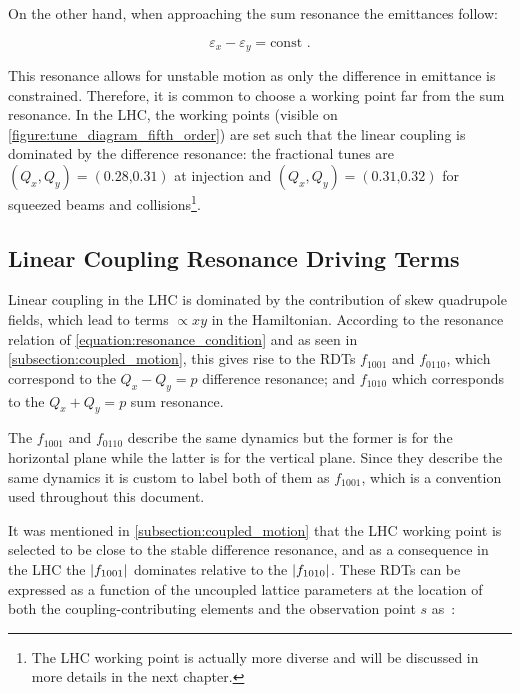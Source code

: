 On the other hand, when approaching the sum resonance the emittances follow:

\begin{equation}
    \varepsilon_x - \varepsilon_y = \mathrm{const} \text{ .}
    \label{equation:coupled_emittances_sum_resonance}
\end{equation}

This resonance allows for unstable motion as only the difference in emittance is constrained.
Therefore, it is common to choose a working point far from the sum resonance.
In the \gls{LHC}, the working points (visible on \cref{figure:tune_diagram_fifth_order}) are set such that the linear coupling is dominated by the difference resonance: the fractional tunes are \((Q_x, Q_y) = (0.28 \text{,} 0.31)\) at injection and \((Q_x, Q_y) = (0.31 \text{,} 0.32)\) for squeezed beams and collisions\footnote{The LHC working point is actually more diverse and will be discussed in more details in the next chapter.}.

\subsection{Linear Coupling Resonance Driving Terms}
\label{subsection:measurement_coupling_rdts}

Linear coupling in the \gls{LHC} is dominated by the contribution of \gls{skew} quadrupole fields, which lead to terms \(\propto xy\) in the Hamiltonian.
According to the resonance relation of \cref{equation:resonance_condition} and as seen in \cref{subsection:coupled_motion}, this gives rise to the \glspl{RDT} \(f_{1001}\) and \(f_{0110}\), which correspond to the \(Q_x - Q_y = p\) difference resonance; and \(f_{1010}\) which corresponds to the \(Q_x + Q_y = p\) sum resonance.

The \(f_{1001}\) and \(f_{0110}\) describe the same dynamics but the former is for the horizontal plane while the latter is for the vertical plane.
Since they describe the same dynamics it is custom to label both of them as \(f_{1001}\), which is a convention used throughout this document.

It was mentioned in \cref{subsection:coupled_motion} that the \gls{LHC} working point is selected to be close to the stable difference resonance, and as a consequence in the LHC the \(\left\lvert f_{1001} \right\rvert\) dominates relative to the \(\left\lvert f_{1010} \right\rvert\).
These \glspl{RDT} can be expressed as a function of the uncoupled lattice parameters at the location of both the coupling-contributing elements and the observation point \(s\) as~\cite{PHREV:Guignard:Betatron_Coupling_Radiation}:

